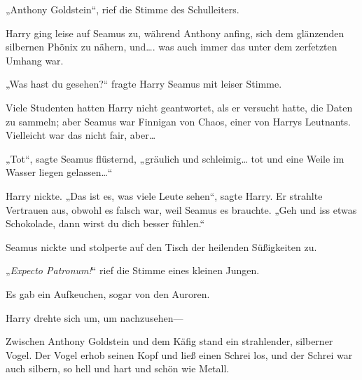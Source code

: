 „Anthony Goldstein“, rief die Stimme des Schulleiters.

Harry ging leise auf Seamus zu, während Anthony anfing, sich dem glänzenden silbernen Phönix zu nähern, und…. was auch immer das unter dem zerfetzten Umhang war.

„Was hast du gesehen?“ fragte Harry Seamus mit leiser Stimme.

Viele Studenten hatten Harry nicht geantwortet, als er versucht hatte, die Daten zu sammeln; aber Seamus war Finnigan von Chaos, einer von Harrys Leutnants. Vielleicht war das nicht fair, aber…

„Tot“, sagte Seamus flüsternd, „gräulich und schleimig… tot und eine Weile im Wasser liegen gelassen…“

Harry nickte. „Das ist es, was viele Leute sehen“, sagte Harry. Er strahlte Vertrauen aus, obwohl es falsch war, weil Seamus es brauchte. „Geh und iss etwas Schokolade, dann wirst du dich besser fühlen.“

Seamus nickte und stolperte auf den Tisch der heilenden Süßigkeiten zu.

„\emph{Expecto Patronum!}“ rief die Stimme eines kleinen Jungen.

Es gab ein Aufkeuchen, sogar von den Auroren.

Harry drehte sich um, um nachzusehen—

Zwischen Anthony Goldstein und dem Käfig stand ein strahlender, silberner Vogel. Der Vogel erhob seinen Kopf und ließ einen Schrei los, und der Schrei war auch silbern, so hell und hart und schön wie Metall.

